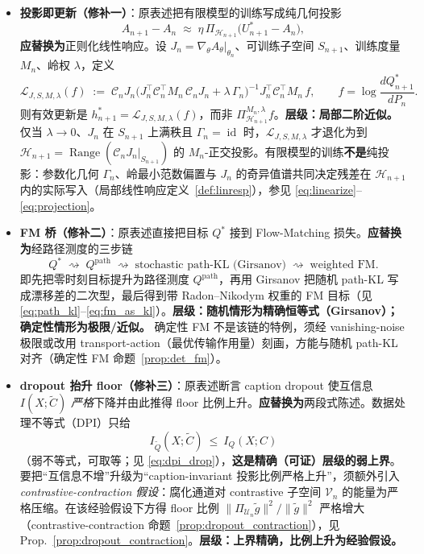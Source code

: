 \documentclass[11pt,a4paper]{article}
\DeclareMathOperator{\id}{id}
\newcommand{\cL}{\mathcal{L}}
\newcommand{\cH}{\mathcal{H}}
\newcommand{\cU}{\mathcal{U}}
\newcommand{\cV}{\mathcal{V}}
\newcommand{\ProjectOp}{\Pi}
\newcommand{\Range}{\operatorname{Range}}
\newcommand{\Center}{\mathcal{C}}
\begin{document}
\begin{itemize}

\item \textbf{投影即更新（修补一）}：原表述把有限模型的训练写成纯几何投影
\[
A_{n+1}-A_n \;\approx\; \eta\,\ProjectOp_{\cH_{n+1}}\bigl(U_{n+1}^*-A_n\bigr),
\]
\textbf{应替换为}正则化线性响应。设 $J_n=\nabla_\theta A_\theta|_{\theta_n}$、可训练子空间 $S_{n+1}$、训练度量 $M_n$、岭权 $\lambda$，定义
\begin{equation*}
\cL_{J,S,M,\lambda}(f) \;:=\; \Center_n J_n\bigl(J_n^\top\Center_n^\top M_n\,\Center_n J_n + \lambda\,\Gamma_n\bigr)^{-1}J_n^\top\Center_n^\top M_n\,f,\qquad f=\log\frac{dQ^*_{n+1}}{dP_n}.
\end{equation*}
则有效更新是 $h^*_{n+1}=\cL_{J,S,M,\lambda}(f)$，而非 $\ProjectOp^{M_n,\lambda}_{\cH_{n+1}}f$。\textbf{层级：局部二阶近似。} 仅当 $\lambda\to 0$、$J_n$ 在 $S_{n+1}$ 上满秩且 $\Gamma_n=\id$ 时，$\cL_{J,S,M,\lambda}$ 才退化为到 $\cH_{n+1}=\Range(\Center_n J_n|_{S_{n+1}})$ 的 $M_n$-正交投影。有限模型的训练\textbf{不是}纯投影：参数化几何 $\Gamma_n$、岭最小范数偏置与 $J_n$ 的奇异值谱共同决定残差在 $\cH_{n+1}$ 内的实际写入（局部线性响应定义~\ref{def:linresp}），参见 \eqref{eq:linearize}--\eqref{eq:projection}。

\item \textbf{FM 桥（修补二）}：原表述直接把目标 $Q^*$ 接到 Flow-Matching 损失。\textbf{应替换为}经路径测度的三步链
\[
Q^* \;\rightsquigarrow\; Q^{\mathrm{path}} \;\rightsquigarrow\; \text{stochastic path-KL (Girsanov)} \;\rightsquigarrow\; \text{weighted FM}.
\]
即先把零时刻目标提升为路径测度 $Q^{\mathrm{path}}$，再用 Girsanov 把随机 path-KL 写成漂移差的二次型，最后得到带 Radon--Nikodym 权重的 FM 目标（见 \eqref{eq:path_kl}--\eqref{eq:fm_as_kl}）。\textbf{层级：随机情形为精确恒等式（Girsanov）；确定性情形为极限/近似。} 确定性 FM 不是该链的特例，须经 vanishing-noise 极限或改用 transport-action（最优传输作用量）刻画，方能与随机 path-KL 对齐（确定性 FM 命题~\ref{prop:det_fm}）。

\item \textbf{dropout 抬升 floor（修补三）}：原表述断言 caption dropout 使互信息 $I(X;\tilde C)$ \emph{严格}下降并由此推得 floor 比例上升。\textbf{应替换为}两段式陈述。数据处理不等式（DPI）只给
\[
I_{\widetilde Q}(X;\tilde C)\ \le\ I_Q(X;C)
\]
（弱不等式，可取等；见 \eqref{eq:dpi_drop}），\textbf{这是精确（可证）层级的弱上界}。要把“互信息不增”升级为“caption-invariant 投影比例严格上升”，须额外引入 \emph{contrastive-contraction 假设}：腐化通道对 contrastive 子空间 $\cV_n$ 的能量为严格压缩。在该经验假设下方得 floor 比例 $\|\ProjectOp_{\cU_n}\tilde g\|^2/\|\tilde g\|^2$ 严格增大（contrastive-contraction 命题~\ref{prop:dropout_contraction}），见 Prop.~\ref{prop:dropout_contraction}。\textbf{层级：上界精确，比例上升为经验假设。}


\end{itemize}
\end{document}
